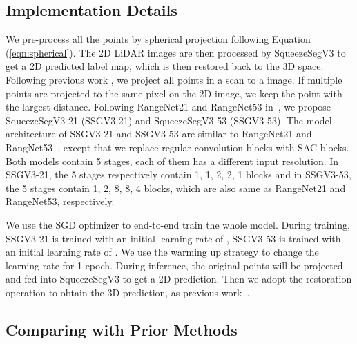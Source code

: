 \documentclass[runningheads]{llncs}
\begin{document}
\subsection{Implementation Details}
We pre-process all the points by spherical projection following Equation (\ref{eqn:spherical}). The 2D LiDAR images are then processed by SqueezeSegV3 to get a 2D predicted label map, which is then restored back to the 3D space. 
Following previous work \cite{milioto2019rangenet++,wu2017squeezeseg,wu2018squeezesegv2}, we project all points in a scan to a  image. If multiple points are projected to the same pixel on the 2D image, we keep the point with the largest distance. Following RangeNet21 and RangeNet53 in~\cite{milioto2019rangenet++}, we propose SqueezeSegV3-21 (SSGV3-21) and SqueezeSegV3-53 (SSGV3-53). The model architecture of SSGV3-21 and SSGV3-53 are similar to RangeNet21 and RangNet53~\cite{milioto2019rangenet++}, except that we replace regular convolution blocks with SAC blocks. Both models contain 5 stages, each of them has a different input resolution. In SSGV3-21, the 5 stages respectively contain 1, 1, 2, 2, 1 blocks and in SSGV3-53, the 5 stages contain 1, 2, 8, 8, 4 blocks, which are also same as  RangeNet21 and RangeNet53, respectively. 

We use the SGD optimizer to end-to-end train the whole model. During training, SSGV3-21 is trained with an initial learning rate of , SSGV3-53 is trained with an initial learning rate of . We use the warming up strategy to change the learning rate for 1 epoch. During inference, the original points will be projected and fed into SqueezeSegV3 to get a 2D prediction. Then we adopt the restoration operation to obtain the 3D prediction, as previous work~\cite{milioto2019rangenet++,wu2017squeezeseg,wu2018squeezesegv2}. 

\subsection{Comparing with Prior Methods}
\end{document}

